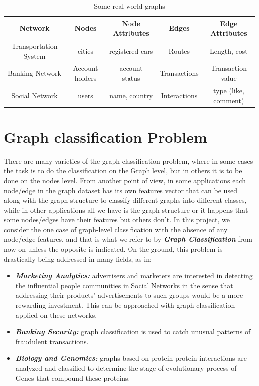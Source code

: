 \begin{table}
\small
\begin{center}
\begin{tabular}{|c|c|c|c|c|}
\hline
{Network}  &  {Nodes} & {Node Attributes}  & {Edges}  & {Edge Attributes}  \\
\hline
{Transportation System}  &  {cities} & {registered cars}  & {Routes}  & {Length, cost }  \\
\hline
{Banking Network}  &  {Account holders} & {account status}  & {Transactions}  & {Transaction value}  \\
\hline
{Social Network}  &  {users} & {name, country}  & {Interactions}  & {type (like, comment)}  \\
\hline
\end{tabular}
\end{center}
\caption{Some real world graphs}
\label{table:Graph_examples}
\end{table}

\section{Graph classification Problem}
\label{sec:Graph_classification_problem}
There are many varieties of the graph classification problem, where in some cases the task is to do the classification on the Graph level, but in others it is to be done on the nodes level. From another point of view, in some applications each node/edge in the graph dataset has its own features vector that can be used along with the graph structure to classify different graphs into different classes, while in other applications all we have is the graph structure or it happens that some nodes/edges have their features but others don't. In this project, we consider the one case of graph-level classification with the absence of any node/edge features, and that is what we refer to by \textbf{\emph{Graph Classification}} from now on unless the opposite is indicated. 
On the ground, this problem is drastically being addressed in many fields, as in:
\begin{itemize}
    \item \textbf{\emph{Marketing Analytics:}} advertisers and marketers  are interested in detecting the influential people communities in Social Networks in the sense that addressing their products' advertisements to such groups would be a more rewarding investment. This can be approached with graph classification applied on these networks.
    \item \textbf{\emph{Banking Security:}} graph classification is used to catch unusual patterns of fraudulent transactions.
    \item \textbf{\emph{Biology and Genomics:}} graphs based on protein-protein interactions are analyzed and classified to determine the stage of  evolutionary process of Genes that compound these proteins.
\end{itemize}

